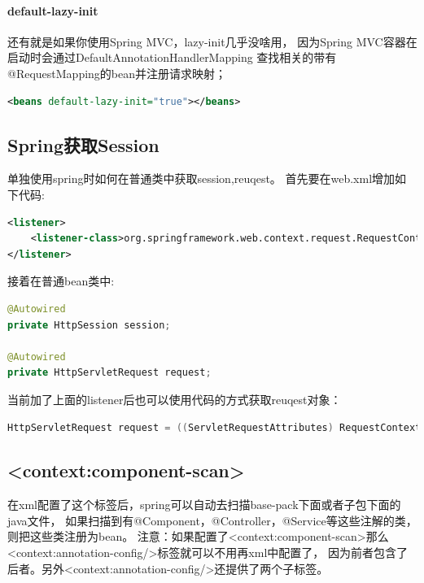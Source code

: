 \documentclass{book}
\begin{document}
\paragraph{default-lazy-init}

还有就是如果你使用Spring MVC，lazy-init几乎没啥用，
因为Spring MVC容器在启动时会通过DefaultAnnotationHandlerMapping
查找相关的带有@RequestMapping的bean并注册请求映射；

\begin{lstlisting}[language=XML]
<beans default-lazy-init="true"></beans>
\end{lstlisting}

\subsection{Spring获取Session}

单独使用spring时如何在普通类中获取session,reuqest。
首先要在web.xml增加如下代码:

\begin{lstlisting}[language=XML]
<listener>
	<listener-class>org.springframework.web.context.request.RequestContextListener</listener-class>
</listener>
\end{lstlisting}

接着在普通bean类中:

\begin{lstlisting}[language=Java]
@Autowired  
private HttpSession session;  

@Autowired  
private HttpServletRequest request;  
\end{lstlisting}

当前加了上面的listener后也可以使用代码的方式获取reuqest对象：

\begin{lstlisting}[language=Java]
HttpServletRequest request = ((ServletRequestAttributes) RequestContextHolder.getRequestAttributes()).getRequest(); 
\end{lstlisting}

\subsection{<context:component-scan>}

在xml配置了这个标签后，spring可以自动去扫描base-pack下面或者子包下面的java文件，
如果扫描到有@Component，@Controller，@Service等这些注解的类，则把这些类注册为bean。
注意：如果配置了<context:component-scan>那么<context:annotation-config/>标签就可以不用再xml中配置了，
因为前者包含了后者。另外<context:annotation-config/>还提供了两个子标签。
\end{document}
